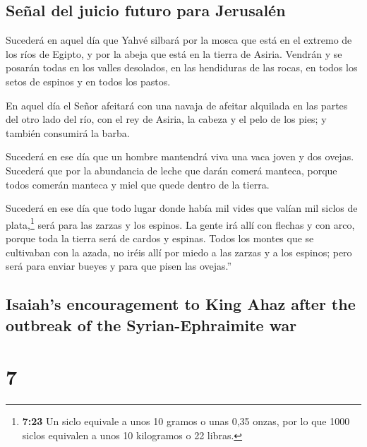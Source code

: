 \begin{paracol}{2}
\hypertarget{seuxf1al-del-juicio-futuro-para-jerusaluxe9n}{%
\subsection{Señal del juicio futuro para
Jerusalén}\label{seuxf1al-del-juicio-futuro-para-jerusaluxe9n}}

 Sucederá en aquel día que Yahvé silbará por la mosca que
está en el extremo de los ríos de Egipto, y por la abeja que está en la
tierra de Asiria.  Vendrán y se posarán todas en los
valles desolados, en las hendiduras de las rocas, en todos los setos de
espinos y en todos los pastos.

 En aquel día el Señor afeitará con una navaja de afeitar
alquilada en las partes del otro lado del río, con el rey de Asiria, la
cabeza y el pelo de los pies; y también consumirá la barba.

 Sucederá en ese día que un hombre mantendrá viva una
vaca joven y dos ovejas.  Sucederá que por la abundancia
de leche que darán comerá manteca, porque todos comerán manteca y miel
que quede dentro de la tierra.

 Sucederá en ese día que todo lugar donde había mil vides
que valían mil siclos de plata,\footnote{\textbf{7:23} Un siclo equivale
  a unos 10 gramos o unas 0,35 onzas, por lo que 1000 siclos equivalen a
  unos 10 kilogramos o 22 libras.} será para las zarzas y los espinos.
 La gente irá allí con flechas y con arco, porque toda la
tierra será de cardos y espinas.  Todos los montes que se
cultivaban con la azada, no iréis allí por miedo a las zarzas y a los
espinos; pero será para enviar bueyes y para que pisen las ovejas.''

\switchcolumn
\begin{otherlanguage}{english}

\hypertarget{isaiahs-encouragement-to-king-ahaz-after-the-outbreak-of-the-syrian-ephraimite-war}{%
\subsection{Isaiah's encouragement to King Ahaz after the outbreak of
the Syrian-Ephraimite
war}\label{isaiahs-encouragement-to-king-ahaz-after-the-outbreak-of-the-syrian-ephraimite-war}}

\hypertarget{section-13}{%
\section{7}\label{section-13}}


\end{otherlanguage}
\end{paracol}
